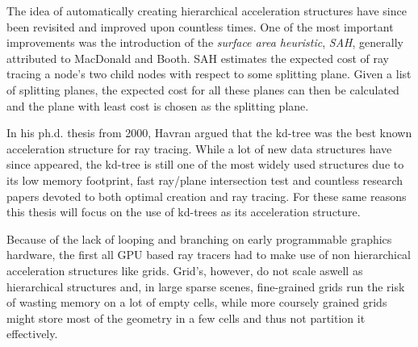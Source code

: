 
The idea of automatically creating hierarchical acceleration structures have
since been revisited and improved upon countless times. One of the most
important improvements was the introduction of the \textit{surface area
  heuristic}, \textit{SAH}, generally attributed to MacDonald and
Booth. SAH estimates the expected cost of ray tracing a
node's two child nodes with respect to some splitting plane. Given a list of
splitting planes, the expected cost for all these planes can then be calculated
and the plane with least cost is chosen as the splitting plane.



In his ph.d. thesis from 2000, Havran argued that the
kd-tree was the best known acceleration structure for ray tracing. While a lot
of new data structures have since appeared, the kd-tree is still one of the most
widely used structures due to its low memory footprint, fast ray/plane
intersection test and countless research papers devoted to both optimal creation
and ray tracing. For these same reasons this thesis will focus on the use of
kd-trees as its acceleration structure.




Because of the lack of looping and branching on early programmable graphics
hardware, the first all GPU based ray tracers had to make use of non
hierarchical acceleration structures like grids. Grid's,
however, do not scale aswell as hierarchical structures and, in large sparse
scenes, fine-grained grids run the risk of wasting memory on a lot of empty
cells, while more coursely grained grids might store most of the geometry in a
few cells and thus not partition it effectively.


